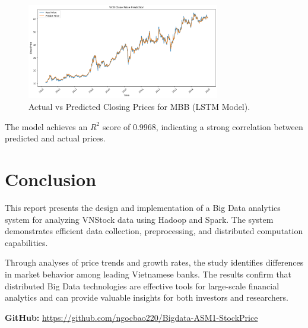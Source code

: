 \documentclass[12pt,a4paper]{article}
\begin{document}
\begin{figure}[H]
\centering
\includegraphics[width=0.75\textwidth]{prediction.png}
\caption{Actual vs Predicted Closing Prices for MBB (LSTM Model).}
\label{fig:prediction}
\end{figure}

The model achieves an $R^2$ score of 0.9968, indicating a strong correlation between predicted and actual prices.

\section{Conclusion}

This report presents the design and implementation of a Big Data analytics system for analyzing VNStock data using Hadoop and Spark.  
The system demonstrates efficient data collection, preprocessing, and distributed computation capabilities.  

Through analyses of price trends and growth rates, the study identifies differences in market behavior among leading Vietnamese banks.  
The results confirm that distributed Big Data technologies are effective tools for large-scale financial analytics and can provide valuable insights for both investors and researchers.

\vspace{1cm}
\noindent\textbf{GitHub:} \url{https://github.com/ngocbao220/Bigdata-ASM1-StockPrice}
\end{document}
